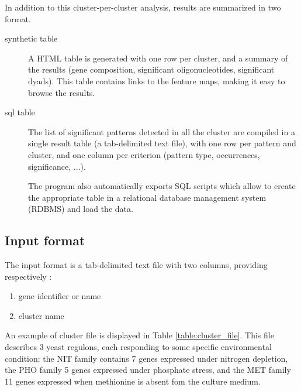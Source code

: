 In addition to this cluster-per-cluster analysis, results are
summarized in two format.

\begin{description}
\item[synthetic table] A HTML table is generated with one row per
cluster, and a summary of the results (gene composition, significant
oligonucleotides, significant dyads). This table contains links to the
feature maps, making it easy to browse the results.

\item[sql table] The list of significant patterns detected in all the
cluster are compiled in a single result table (a tab-delimited text
file), with one row per pattern and cluster, and one column per
criterion (pattern type, occurrences, significance, ...). 

The program also automatically exports SQL scripts which allow to
create the appropriate table in a relational database management
system (RDBMS) and load the data.
\end{description}

\subsection{Input format}

The input format is a tab-delimited text file with two columns, providing respectively :
\begin{enumerate}
\item gene identifier or name
\item cluster name
\end{enumerate}

An example of cluster file is displayed in Table
\ref{table:cluster_file}. This file describes 3 yeast regulons, each
responding to some specific environmental condition: the NIT family
contains 7 genes expressed under nitrogen depletion, the PHO family 5
genes expressed under phosphate stress, and the MET family 11 genes
expressed when methionine is absent fom the culture medium.

